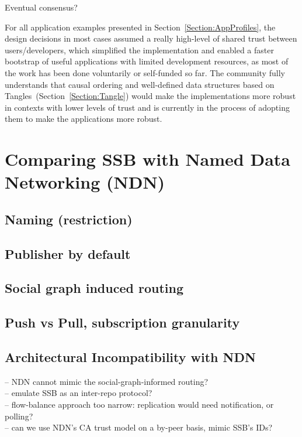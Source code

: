 \documentclass[sigconf]{acmart}
\begin{document}
Eventual consensus?

For all application examples presented in Section~\ref{Section:AppProfiles},
the design decisions in most cases assumed a really high-level of shared trust
between users/developers, which simplified the implementation and enabled a
faster bootstrap of useful applications with limited development resources, as
most of the work has been done voluntarily or self-funded so far. The community
fully understands that causal ordering and well-defined data structures based
on Tangles~(Section~\ref{Section:Tangle}) would make the implementations more
robust in contexts with lower levels of trust and is currently in the process
of adopting them to make the applications more robust.

\section{Comparing SSB with Named Data Networking (NDN)}

\subsection{Naming (restriction)}

\subsection{Publisher by default}

\subsection{Social graph induced routing}

\subsection{Push vs Pull, subscription granularity}

\subsection{Architectural Incompatibility with NDN}

-- NDN cannot mimic the social-graph-informed routing?\\
-- emulate SSB as an inter-repo protocol?\\
-- flow-balance approach too narrow: replication would need notification, or polling?\\
-- can we use NDN's CA trust model on a by-peer basis, mimic SSB's IDs?
\end{document}
